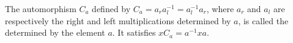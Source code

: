The automorphism $C_a$ defined by $C_a = a_r a_l^{-1} = a_l^{-1} a_r$, where $a_r$ and $a_l$ are respectively the right and left multiplications determined by $a$, is called the  determined by the element $a$. It satisfies $x C_a = a^{-1} x a$.
